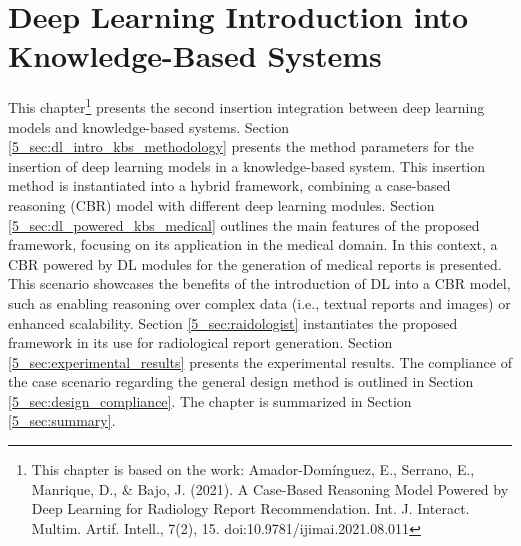 \chapter{Deep Learning Introduction into Knowledge-Based Systems}
\label{chap:dlintegrationkbs} 

This chapter\footnote{This chapter is based on the work: Amador-Domínguez, E., Serrano, E., Manrique, D., & Bajo, J. (2021). A Case-Based Reasoning Model Powered by Deep Learning for Radiology Report Recommendation. Int. J. Interact. Multim. Artif. Intell., 7(2), 15. doi:10.9781/ijimai.2021.08.011} presents the second insertion integration between deep learning models and knowledge-based systems. Section \ref{5_sec:dl_intro_kbs_methodology} presents the method parameters for the insertion of deep learning models in a knowledge-based system. This insertion method is instantiated into a hybrid framework, combining a case-based reasoning (CBR) model with different deep learning modules. Section \ref{5_sec:dl_powered_kbs_medical} outlines the main features of the proposed framework, focusing on its application in the medical domain. In this context, a CBR powered by DL modules for the generation of medical reports is presented. This scenario showcases the benefits of the introduction of DL into a CBR model, such as enabling reasoning over complex data (i.e., textual reports and images) or enhanced scalability. Section \ref{5_sec:raidologist} instantiates the proposed framework in its use for radiological report generation. Section \ref{5_sec:experimental_results} presents the experimental results. The compliance of the case scenario regarding the general design method is outlined in Section \ref{5_sec:design_compliance}. The chapter is summarized in Section \ref{5_sec:summary}. 


